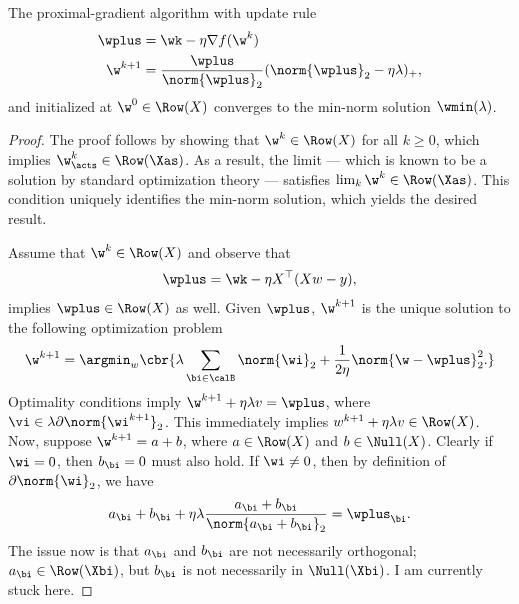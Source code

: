 \begin{proposition}\label{prop:proximal-gradient}
	The proximal-gradient algorithm with update rule
	\begin{equation}\label{eq:proximal-gradient}
		\begin{aligned}
			\wplus   & = \wk - \eta \nabla f(\w^k)                                          \\
			\w^{k+1} & =  \frac{\wplus}{\norm{\wplus}_2}(\norm{\wplus}_2 - \eta \lambda)_+,
		\end{aligned}
	\end{equation}
	and initialized at \( \w^0 \in \Row(X) \) converges to the min-norm solution \( \wmin(\lambda) \).
\end{proposition}
\begin{proof}
	The proof follows by showing that \( \w^{k} \in \Row(X) \)
	for all \( k \geq 0 \), which implies \( \w^{k}_\acts \in \Row(\Xas) \).
	As a result, the limit --- which is known to be a solution by standard
	optimization theory --- satisfies \( \lim_k \w^k \in \Row(\Xas) \).
	This condition uniquely identifies the min-norm solution,
	which yields the desired result.

	Assume that \( \w^k \in \Row(X) \) and observe that
	\[
		\wplus = \wk - \eta X^\top (X w - y),
	\]
	implies \( \wplus \in \Row(X) \) as well.
	Given \( \wplus \), \( \w^{k+1} \) is the unique solution to the following
	optimization problem
	\[
		\w^{k+1} =
		\argmin_{w} \cbr{
			\lambda \sum_{\bi \in \calB} \norm{\wi}_2 +
			\frac{1}{2\eta}\norm{\w - \wplus}_2^2.
		}
	\]
	Optimality conditions imply \( \w^{k+1} + \eta \lambda v = \wplus \),
	where \( \vi \in \lambda \partial \norm{\wi^{k+1}}_2 \).
	This immediately implies \( w^{k+1} + \eta \lambda v \in \Row(X) \).
	Now, suppose \( \w^{k+1} = a + b \), where \( a \in \Row(X) \) and
	\( b \in \Null(X) \).
	Clearly if \( \wi = 0 \), then \( b_\bi = 0 \) must also hold.
	If \( \wi \neq 0 \), then
	by definition of \( \partial \norm{\wi}_2 \), we have
	\[
		a_\bi + b_\bi + \eta \lambda \frac{a_\bi + b_\bi}{\norm{a_\bi + b_\bi}_2}
		= \wplus_\bi.
	\]
	The issue now is that \( a_\bi \) and \( b_\bi \) are not necessarily
	orthogonal; \( a_\bi \in \Row(\Xbi) \), but \( b_\bi \) is not necessarily in
	\( \Null(\Xbi) \).
	I am currently stuck here.
\end{proof}

